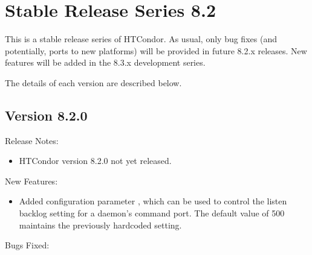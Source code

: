 
\section{\label{sec:History-8-2}Stable Release Series 8.2}

This is a stable release series of HTCondor.
As usual, only bug fixes (and potentially, ports to new platforms)
will be provided in future 8.2.x releases.
New features will be added in the 8.3.x development series.

The details of each version are described below.

\subsection*{\label{sec:New-8-2-0}Version 8.2.0}

\noindent Release Notes:

\begin{itemize}

\item HTCondor version 8.2.0 not yet released.

\end{itemize}


\noindent New Features:

\begin{itemize}

\item Added configuration parameter , which
can be used to control the listen backlog setting for a daemon's command
port.
The default value of 500 maintains the previously hardcoded setting.

\end{itemize}

\noindent Bugs Fixed:

